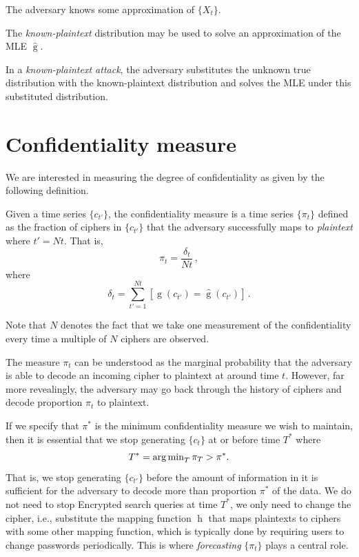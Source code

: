\documentclass[final,
  11pt,
]{article}
\begin{document}
\begin{assumption}
The adversary knows some approximation of $\{X_t\}$.
\end{assumption}

The \emph{known-plaintext} distribution may be used to solve an
approximation of the MLE \(\hat{\operatorname{g}}\).

\begin{definition}
In a \emph{known-plaintext attack}, the adversary substitutes the unknown true
distribution with the known-plaintext distribution and solves the MLE under
this substituted distribution.
\end{definition}

\section{Confidentiality measure}

We are interested in measuring the degree of confidentiality as given by
the following definition.

\begin{definition}
Given a time series $\{c_{t'}\}$, the confidentiality measure is a time series
$\{\pi_t\}$ defined as the fraction of ciphers in $\{c_{t'}\}$ that the adversary
successfully maps to \emph{plaintext} where $t' = N t$.
That is,
\begin{equation}
\label{eq:accuracy}
    \pi_t = \frac{\delta_t}{N t}\,,
\end{equation}
where
\begin{equation}
    \delta_t = \sum_{t'=1}^{N t} [\operatorname{g}(c_{t'}) = \hat{\operatorname{g}}(c_{t'})]\,.
\end{equation}
\end{definition}

Note that \(N\) denotes the fact that we take one measurement of the
confidentiality every time a multiple of \(N\) ciphers are observed.

The measure \(\pi_t\) can be understood as the marginal probability that
the adversary is able to decode an incoming cipher to plaintext at
around time \(t\). However, far more revealingly, the adversary may go
back through the history of ciphers and decode proportion \(\pi_t\) to
plaintext.

If we specify that \(\pi^*\) is the minimum confidentiality measure we
wish to maintain, then it is essential that we stop generating
\(\{c_t\}\) at or before time \(T^*\) where \[
  T^* = \operatorname{arg\,min}_{T} \pi_T > \pi^*.
\] That is, we stop generating \(\{c_{t'}\}\) before the amount of
information in it is sufficient for the adversary to decode more than
proportion \(\pi^*\) of the data. We do not need to stop Encrypted
search queries at time \(T^*\), we only need to change the cipher, i.e.,
substitute the mapping function \(\operatorname{h}\) that maps
plaintexts to ciphers with some other mapping function, which is
typically done by requiring users to change passwords periodically. This
is where \emph{forecasting} \(\{\pi_t\}\) plays a central role.
\end{document}
